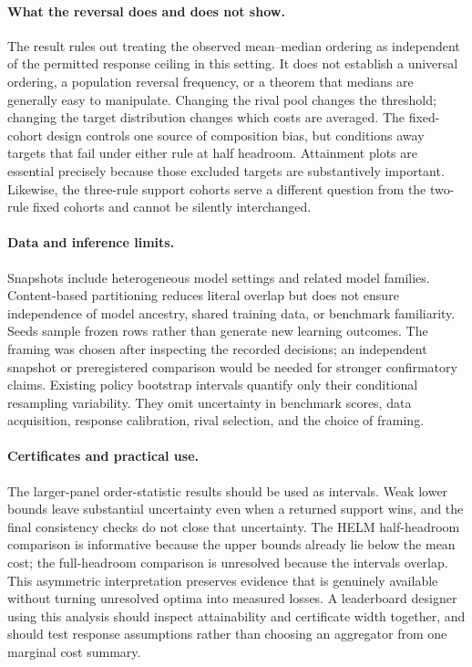 \documentclass{article}
\begin{document}
\paragraph{What the reversal does and does not show.}
The result rules out treating the observed mean--median ordering as independent of the permitted response ceiling in this setting. It does not establish a universal ordering, a population reversal frequency, or a theorem that medians are generally easy to manipulate. Changing the rival pool changes the threshold; changing the target distribution changes which costs are averaged. The fixed-cohort design controls one source of composition bias, but conditions away targets that fail under either rule at half headroom. Attainment plots are essential precisely because those excluded targets are substantively important. Likewise, the three-rule support cohorts serve a different question from the two-rule fixed cohorts and cannot be silently interchanged.

\paragraph{Data and inference limits.}
Snapshots include heterogeneous model settings and related model families. Content-based partitioning reduces literal overlap but does not ensure independence of model ancestry, shared training data, or benchmark familiarity. Seeds sample frozen rows rather than generate new learning outcomes. The framing was chosen after inspecting the recorded decisions; an independent snapshot or preregistered comparison would be needed for stronger confirmatory claims. Existing policy bootstrap intervals quantify only their conditional resampling variability. They omit uncertainty in benchmark scores, data acquisition, response calibration, rival selection, and the choice of framing.

\paragraph{Certificates and practical use.}
The larger-panel order-statistic results should be used as intervals. Weak lower bounds leave substantial uncertainty even when a returned support wins, and the final consistency checks do not close that uncertainty. The HELM half-headroom comparison is informative because the upper bounds already lie below the mean cost; the full-headroom comparison is unresolved because the intervals overlap. This asymmetric interpretation preserves evidence that is genuinely available without turning unresolved optima into measured losses. A leaderboard designer using this analysis should inspect attainability and certificate width together, and should test response assumptions rather than choosing an aggregator from one marginal cost summary.
\end{document}
